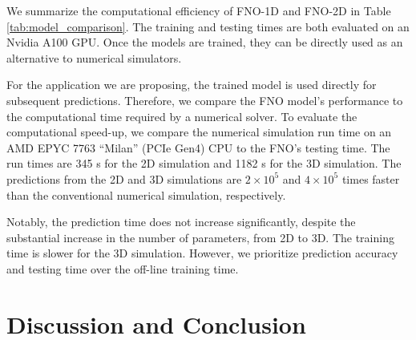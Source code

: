 \documentclass[draft]{agujournal2019}
\begin{document}
We summarize the computational efficiency of FNO-1D and FNO-2D in Table \ref{tab:model_comparison}. The training and testing times are both evaluated on an Nvidia A100 GPU. Once the models are trained, they can be directly used as an alternative to numerical simulators.

For the application we are proposing, the trained model is used directly for subsequent predictions. Therefore, we compare the FNO model's performance to the computational time required by a numerical solver. To evaluate the computational speed-up, we compare the numerical simulation run time on an AMD EPYC 7763 “Milan” (PCIe Gen4) CPU to the FNO's testing time. The run times are 345 s for the 2D simulation and 1182 s for the 3D simulation. The predictions from the 2D and 3D simulations are $2 \times 10^{5}$ and $4 \times 10^{5}$ times faster than the conventional numerical simulation, respectively.

Notably, the prediction time does not increase significantly, despite the substantial increase in the number of parameters, from 2D to 3D. The training time is slower for the 3D simulation. However, we prioritize prediction accuracy and testing time over the off-line training time.

\begin{table}
\caption{Comparison of different models in terms of parameters, training time, testing performance, and speed-up. The testing times are calculated by taking the median of 100 random cases. The speed-up is compared with numerical simulation run time of 345 s for 2D and 1182 s for 3D.}
    \centering
    \label{tab:model_comparison}
\end{table}


\section{Discussion and Conclusion}
\label{sec:discussion}
\end{document}
